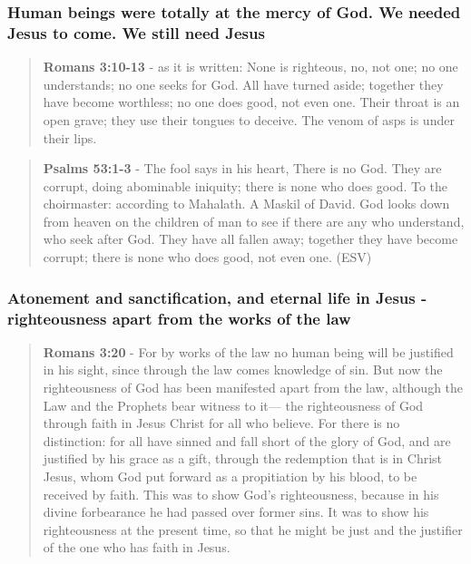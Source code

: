 \documentclass[11pt]{article}
\begin{document}
\subsubsection{Human beings were totally at the mercy of God. We needed Jesus to come. We still need Jesus}
\label{sec:orge6ed556}
\begin{quote}
\textbf{Romans 3:10-13} - as it is written: None is righteous, no, not one; no one understands; no one seeks for God.  All have turned aside; together they have become worthless; no one does good, not even one.  Their throat is an open grave; they use their tongues to deceive. The venom of asps is under their lips.
\end{quote}

\begin{quote}
\textbf{Psalms 53:1-3} -  The fool says in his heart, There is no God.  They are corrupt, doing abominable iniquity; there is none who does good.  To the choirmaster: according to Mahalath.  A Maskil of David.  God looks down from heaven on the children of man to see if there are any who understand, who seek after God.  They have all fallen away; together they have become corrupt; there is none who does good, not even one.  (ESV)
\end{quote}

\subsubsection{Atonement and sanctification, and eternal life in Jesus - righteousness apart from the works of the law}
\label{sec:org3f8d3c4}
\begin{quote}
\textbf{Romans 3:20} - For by works of the law no human being will be justified in his sight, since through the law comes knowledge of sin.  But now the righteousness of God has been manifested apart from the law, although the Law and the Prophets bear witness to it— the righteousness of God through faith in Jesus Christ for all who believe. For there is no distinction: for all have sinned and fall short of the glory of God, and are justified by his grace as a gift, through the redemption that is in Christ Jesus, whom God put forward as a propitiation by his blood, to be received by faith. This was to show God's righteousness, because in his divine forbearance he had passed over former sins.  It was to show his righteousness at the present time, so that he might be just and the justifier of the one who has faith in Jesus.
\end{quote}
\end{document}
